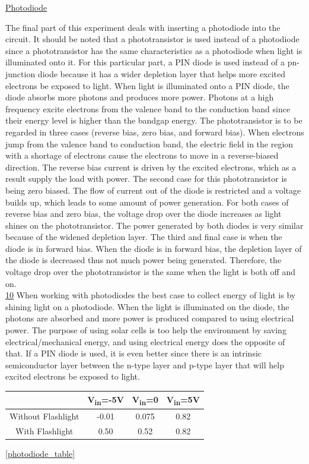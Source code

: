\underline{Photodiode}

The final part of this experiment deals with inserting a photodiode into the circuit. It should be noted that a phototransistor is used instead of a photodiode since a  phototransistor has the same characteristics as a photodiode when light is illuminated onto it. For this particular part, a PIN diode is used instead of a pn-junction diode because it has a wider depletion layer that helps more excited electrons be exposed to light. When light is illuminated onto a PIN diode, the diode absorbs more photons and produces more power. Photons at a high frequency excite electrons from the valence band to the conduction band since their energy level is higher than the bandgap energy. The phototransistor is to be regarded in three cases (reverse bias, zero bias, and forward bias). When electrons jump from the valence band to conduction band, the electric field in the region with a shortage of electrons cause the electrons to move in a reverse-biased direction. The reverse bias current is driven by the excited electrons, which as a result supply the load with power. The second case for this phototransistor is being zero biased. The flow of current out of the diode is restricted and a voltage builds up, which leads to some amount of power generation. For both cases of reverse bias and zero bias, the voltage drop over the diode increases as light shines on the phototransistor. The power generated by both diodes is very similar because of the widened depletion layer. The third and final case is when the diode is in forward bias. When the diode is in forward bias, the depletion layer of the diode is decreased thus not much power being generated. Therefore, the voltage drop over the phototransistor is the same when the light is both off and on. \\

\underline{10}
When working with photodiodes the best case to collect energy of light is by shining light on a photodiode. When the light is illuminated on the diode, the photons are absorbed and more power is produced compared to using electrical power. The purpose of using solar cells is too help the environment by saving electrical/mechanical energy, and using electrical energy does the opposite of that. If a PIN diode is used, it is even better since there is an intrinsic semiconductor layer between the n-type layer and p-type layer that will help excited electrons be exposed to light. \\
\begin{table}
	\centering
	\begin{tabular}{| c | c | c | c |}\hline
		& V\textsubscript{in}=-5V & V\textsubscript{in}=0 & V\textsubscript{in}=5V \\\hline
		Without Flashlight & -0.01 & 0.075 & 0.82\\\hline
		With Flashlight & 0.50 & 0.52 & 0.82 \\\hline
	\end{tabular}
\label{Voltage over Photodiode}
\ref{photodiode_table}
\end{table}

